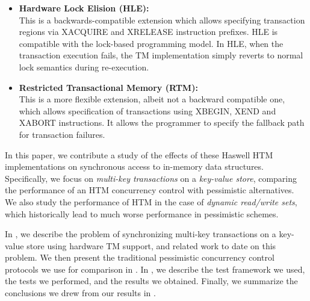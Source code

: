 \begin{itemize} 
\item \textbf{Hardware Lock Elision (HLE):} \\ This is a backwards-compatible
  extension which allows specifying transaction regions via \textrm{XACQUIRE}
  and \textrm{XRELEASE} instruction prefixes. HLE is compatible with the
  lock-based programming model. In HLE, when the transaction execution fails,
  the TM implementation simply reverts to normal lock semantics during
  re-execution. \\
\item \textbf{Restricted Transactional Memory (RTM):} \\ This is a more flexible
  extension, albeit not a backward compatible one, which allows specification of
  transactions using \textrm{XBEGIN, XEND and XABORT} instructions. It allows
  the programmer to specify the fallback path for transaction failures. \\
\end{itemize}

In this paper, we contribute a study of the effects of these Haswell HTM
implementations on synchronous access to in-memory data
structures. Specifically, we focus on \textit{multi-key transactions} on a
\textit{key-value store}, comparing the performance of an HTM concurrency
control with pessimistic alternatives. We also study the performance of HTM in
the case of \textit{dynamic read/write sets}, which historically lead to much
worse performance in pessimistic schemes.

In , we describe the problem of synchronizing multi-key
transactions on a key-value store using hardware TM support, and related work to
date on this problem. We then present the traditional pessimistic concurrency
control protocols we use for comparison in . In
, we describe the test framework we used, the tests we performed,
and the results we obtained. Finally, we summarize the conclusions we drew from
our results in .
